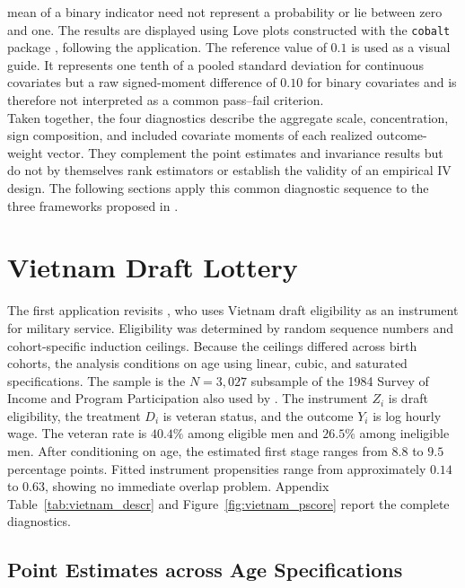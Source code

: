 \documentclass[12pt, a4paper, oneside]{article}
\theoremstyle{plain}
\theoremstyle{definition}
\begin{document}
mean of a binary indicator need not represent a probability or lie between
zero and one. 
The results are displayed using Love plots constructed with the
\texttt{cobalt} package \citep{greifer2024cobalt}, following the application. The reference value of \(0.1\) is used
as a visual guide. It represents one tenth of a pooled standard deviation for
continuous covariates but a raw signed-moment difference of \(0.10\) for
binary covariates and is therefore not interpreted as a common pass--fail
criterion.\\
Taken together, the four diagnostics describe the aggregate scale,
concentration, sign composition, and included covariate moments of each
realized outcome-weight vector. They complement the point estimates and
invariance results but do not by themselves rank estimators or establish the
validity of an empirical IV design. The following sections apply this common
diagnostic sequence to the three frameworks proposed in \citet{sloczynski2025abadie}.


\newpage

\section{Vietnam Draft Lottery}
\label{sec:vietnam}

The first application revisits \citet{angrist1990lifetime}, who uses Vietnam draft eligibility as an instrument for military service. Eligibility was determined by random sequence numbers and cohort-specific induction ceilings. Because the ceilings differed across birth cohorts, the analysis conditions on age using linear, cubic, and saturated specifications. The sample is the \(N=3{,}027\) subsample of the 1984 Survey of Income and Program Participation also used by \citet{sloczynski2025abadie}. The instrument \(Z_i\) is draft eligibility, the treatment \(D_i\) is veteran status, and the outcome \(Y_i\) is log hourly wage.
The veteran rate is \(40.4\%\) among eligible men and \(26.5\%\) among ineligible men. After conditioning on age, the estimated first stage ranges from \(8.8\) to \(9.5\) percentage points. Fitted instrument propensities range from approximately \(0.14\) to \(0.63\), showing no immediate overlap problem. Appendix Table~\ref{tab:vietnam_descr} and Figure~\ref{fig:vietnam_pscore} report the complete diagnostics.


\subsection{Point Estimates across Age Specifications}
\end{document}
